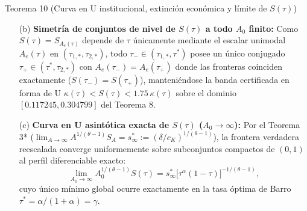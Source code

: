 \documentclass[11pt,letterpaper]{article}
\theoremstyle{plain}
\newtheorem*{namedthm}{\protect\namedthmname}
\newcommand{\namedthmname}{}
\newenvironment{thm_box}[1]{\renewcommand{\namedthmname}{#1}\begin{namedthm}}{\end{namedthm}}
\begin{document}
\begin{thm_box}{Teorema 10 (Curva en U institucional, extinción económica y límite de $S(\tau)$)}
\begin{enumerate}
\begin{itemize}
Sin embargo, $\overline{S}_{\mathrm{asy}}(\tau)$ \emph{no} es una cota superior universal a $A$ finito: en el modelo de referencia ($A_0=1.45, \alpha=0.25$), la frontera verdadera $S(\tau)$ por VFI cruza por encima de $\overline{S}_{\mathrm{asy}}(\tau)$ cuando $A_e(\tau)<A_{\mathrm{cross}}=0.110038$ (es decir, fuera de $(\tau_{c,1},\tau_{c,2})=(3.317089\times 10^{-5}, 0.922567)$), manteniéndose $S(\tau)\le\overline{S}_{\mathrm{asy}}(\tau)$ empíricamente para $A_e(\tau)\ge A_{\mathrm{cross}}$. La única \emph{cota superior certificada a $A$ finito} disponible analíticamente es la del Teorema 8, $\overline{S}_{\mathrm{cert}}(\tau) := 0.0014025025\,[A_e(\tau)]^{-2} = (0.03745)^2 [A_e(\tau)]^{-2}$, rigurosamente válida sobre el dominio $A_e(\tau)\ge 0.749$ ($\tau\in[0.117245, 0.304799]$).
\item[(b)] \textbf{Simetría de conjuntos de nivel de $S(\tau)$ a todo $A_0$ finito:} Como $S(\tau)=S_{A_e(\tau)}$ depende de $\tau$ únicamente mediante el escalar unimodal $A_e(\tau)$ en $(\tau_{1,*},\tau_{2,*})$, todo $\tau_-\in(\tau_{1,*},\tau^*)$ posee un único conjugado $\tau_+\in(\tau^*,\tau_{2,*})$ con $A_e(\tau_-)=A_e(\tau_+)$ donde las fronteras coinciden exactamente ($S(\tau_-)=S(\tau_+)$), manteniéndose la banda certificada en forma de U $\kappa(\tau)<S(\tau)<1.75\,\kappa(\tau)$ sobre el dominio $[0.117245, 0.304799]$ del Teorema 8.
\item[(c)] \textbf{Curva en U asintótica exacta de $S(\tau)$ ($A_0\to\infty$):} Por el Teorema 3* ($\lim_{A\to\infty}A^{1/(\theta-1)}S_A = s_\infty^* := (\delta/c_K)^{1/(\theta-1)}$), la frontera verdadera reescalada converge uniformemente sobre subconjuntos compactos de $(0,1)$ al perfil diferenciable exacto:
\[
\lim_{A_0\to\infty} A_0^{1/(\theta-1)} S(\tau) = s_\infty^*\big[\tau^\alpha(1-\tau)\big]^{-1/(\theta-1)},
\]
cuyo único mínimo global ocurre exactamente en la tasa óptima de Barro $\tau^*=\alpha/(1+\alpha)=\gamma$.
\end{itemize}
\end{enumerate}
\end{thm_box}
\end{document}
